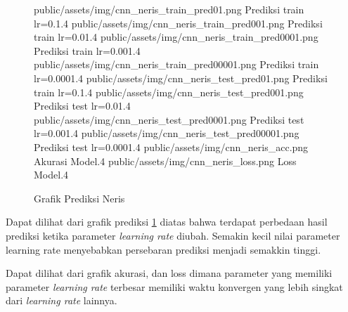 \documentclass[./skripsi.tex]{subfiles}
\begin{document}
\begin{figure}[H]
\centering
\buatsubgrafik 
{public/assets/img/cnn_neris_train_pred01.png}
{Prediksi train lr=0.1}{.4}
\buatsubgrafik 
{public/assets/img/cnn_neris_train_pred001.png}
{Prediksi train lr=0.01}{.4}
\buatsubgrafik 
{public/assets/img/cnn_neris_train_pred0001.png}
{Prediksi train lr=0.001}{.4}
\buatsubgrafik 
{public/assets/img/cnn_neris_train_pred00001.png}
{Prediksi train lr=0.0001}{.4}
\buatsubgrafik 
{public/assets/img/cnn_neris_test_pred01.png}
{Prediksi train lr=0.1}{.4}
\buatsubgrafik 
{public/assets/img/cnn_neris_test_pred001.png}
{Prediksi test lr=0.01}{.4}
\buatsubgrafik 
{public/assets/img/cnn_neris_test_pred0001.png}
{Prediksi test lr=0.001}{.4}
\buatsubgrafik 
{public/assets/img/cnn_neris_test_pred00001.png}
{Prediksi test lr=0.0001}{.4}
\buatsubgrafik 
{public/assets/img/cnn_neris_acc.png}
{Akurasi Model}{.4}
\buatsubgrafik 
{public/assets/img/cnn_neris_loss.png}
{Loss Model}{.4}
\caption{Grafik Prediksi Neris}
\label{fig:cnn_neris_pred}
\end{figure}
\par Dapat dilihat dari grafik prediksi \ref{fig:cnn_neris_pred} diatas bahwa terdapat perbedaan hasil prediksi ketika parameter \textit{learning rate} diubah. Semakin kecil nilai parameter learning rate menyebabkan persebaran prediksi menjadi semakkin tinggi.
\par Dapat dilihat dari grafik akurasi, dan loss dimana parameter yang memiliki parameter \textit{learning rate} terbesar memiliki waktu konvergen yang lebih singkat dari \textit{learning rate} lainnya.
\end{document}
